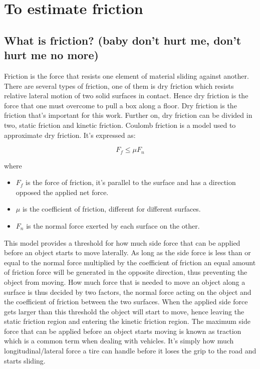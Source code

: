 \chapter{To estimate friction}

\section{What is friction? (baby don't hurt me, don't hurt me no more)}
Friction is the force that resists one element of material sliding against another. There are several types of friction, one of them is dry friction which resists relative lateral motion of two solid surfaces in contact. Hence dry friction is the force that one must overcome to pull a box along a floor. Dry friction is the friction that's important for this work. Further on, dry friction can be divided in two, static friction and kinetic friction. Coulomb friction is a model used to approximate dry friction. It's expressed as:

\begin{equation}
F_{f}\leq\mu F_{n}
\end{equation}

where

\begin{itemize}
	\item $ F_{f} $ is the force of friction, it's parallel to the surface and has a direction opposed the applied net force.
	\item $ \mu $ is the coefficient of friction, different for different surfaces.
	\item $ F_{n} $ is the normal force exerted by each surface on the other.
\end{itemize}

This model provides a threshold for how much side force that can be applied before an object starts to move laterally. As long as the side force is less than or equal to the normal force multiplied by the coefficient of friction an equal amount of friction force will be generated in the opposite direction, thus preventing the object from moving. How much force that is needed to move an object along a surface is thus decided by two factors, the normal force acting on the object and the coefficient of friction between the two surfaces. When the applied side force gets larger than this threshold the object will start to move, hence leaving the static friction region and entering the kinetic friction region. The maximum side force that can be applied before an object starts moving is known as traction which is a common term when dealing with vehicles. It's simply how much longitudinal/lateral force a tire can handle before it loses the grip to the road and starts sliding.

